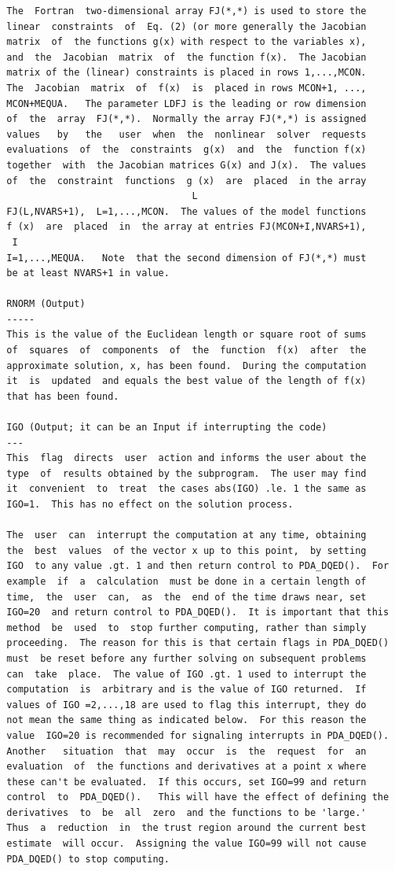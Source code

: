 \documentclass[11pt,twoside]{article}
\begin{document}
\begin{verbatim}
  The  Fortran  two-dimensional array FJ(*,*) is used to store the
  linear  constraints  of  Eq. (2) (or more generally the Jacobian
  matrix  of  the functions g(x) with respect to the variables x),
  and  the  Jacobian  matrix  of  the function f(x).  The Jacobian
  matrix of the (linear) constraints is placed in rows 1,...,MCON.
  The  Jacobian  matrix  of  f(x)  is  placed in rows MCON+1, ...,
  MCON+MEQUA.   The parameter LDFJ is the leading or row dimension
  of  the  array  FJ(*,*).  Normally the array FJ(*,*) is assigned
  values   by   the   user  when  the  nonlinear  solver  requests
  evaluations  of  the  constraints  g(x)  and  the  function f(x)
  together  with  the Jacobian matrices G(x) and J(x).  The values
  of  the  constraint  functions  g (x)  are  placed  in the array
                                   L
  FJ(L,NVARS+1),  L=1,...,MCON.  The values of the model functions
  f (x)  are  placed  in  the array at entries FJ(MCON+I,NVARS+1),
   I
  I=1,...,MEQUA.   Note  that the second dimension of FJ(*,*) must
  be at least NVARS+1 in value.

  RNORM (Output)
  -----
  This is the value of the Euclidean length or square root of sums
  of  squares  of  components  of  the  function  f(x)  after  the
  approximate solution, x, has been found.  During the computation
  it  is  updated  and equals the best value of the length of f(x)
  that has been found.

  IGO (Output; it can be an Input if interrupting the code)
  ---
  This  flag  directs  user  action and informs the user about the
  type  of  results obtained by the subprogram.  The user may find
  it  convenient  to  treat  the cases abs(IGO) .le. 1 the same as
  IGO=1.  This has no effect on the solution process.

  The  user  can  interrupt the computation at any time, obtaining
  the  best  values  of the vector x up to this point,  by setting
  IGO  to any value .gt. 1 and then return control to PDA_DQED().  For
  example  if  a  calculation  must be done in a certain length of
  time,  the  user  can,  as  the  end of the time draws near, set
  IGO=20  and return control to PDA_DQED().  It is important that this
  method  be  used  to  stop further computing, rather than simply
  proceeding.  The reason for this is that certain flags in PDA_DQED()
  must  be reset before any further solving on subsequent problems
  can  take  place.  The value of IGO .gt. 1 used to interrupt the
  computation  is  arbitrary and is the value of IGO returned.  If
  values of IGO =2,...,18 are used to flag this interrupt, they do
  not mean the same thing as indicated below.  For this reason the
  value  IGO=20 is recommended for signaling interrupts in PDA_DQED().
  Another   situation  that  may  occur  is  the  request  for  an
  evaluation  of  the functions and derivatives at a point x where
  these can't be evaluated.  If this occurs, set IGO=99 and return
  control  to  PDA_DQED().   This will have the effect of defining the
  derivatives  to  be  all  zero  and the functions to be 'large.'
  Thus  a  reduction  in  the trust region around the current best
  estimate  will occur.  Assigning the value IGO=99 will not cause
  PDA_DQED() to stop computing.


\end{verbatim}
\end{document}
